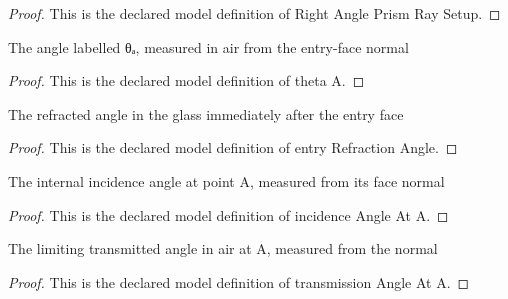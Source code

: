 \begin{proof}
  This is the declared model definition of Right Angle Prism Ray Setup.
\end{proof}
\begin{definition}[theta A]
  \label{def:physics:phyx-mini-0097:phyxminiproblems-problemphyxmini0097-thetaa}
  The angle labelled θₐ, measured in air from the entry-face normal
\end{definition}
\begin{proof}
  This is the declared model definition of theta A.
\end{proof}
\begin{definition}
  \label{def:physics:phyx-mini-0097:phyxminiproblems-problemphyxmini0097-entryrefractionangle}
  The refracted angle in the glass immediately after the entry face
\end{definition}
\begin{proof}
  This is the declared model definition of entry Refraction Angle.
\end{proof}
\begin{definition}
  \label{def:physics:phyx-mini-0097:phyxminiproblems-problemphyxmini0097-incidenceangleata}
  The internal incidence angle at point A, measured from its face normal
\end{definition}
\begin{proof}
  This is the declared model definition of incidence Angle At A.
\end{proof}
\begin{definition}
  \label{def:physics:phyx-mini-0097:phyxminiproblems-problemphyxmini0097-transmissionangleata}
  The limiting transmitted angle in air at A, measured from the normal
\end{definition}
\begin{proof}
  This is the declared model definition of transmission Angle At A.
\end{proof}
